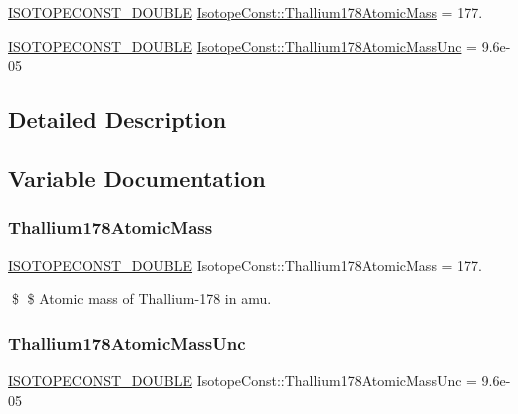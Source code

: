 \begin{DoxyCompactItemize}
\item 
\mbox{\hyperlink{group___isotope_const-_macros_ga8f45a7272ce02c0b4c65c44636ed719a}{I\+S\+O\+T\+O\+P\+E\+C\+O\+N\+S\+T\+\_\+\+D\+O\+U\+B\+LE}} \mbox{\hyperlink{group___isotope_const-_thallium-_tl178_ga391e9a295873758c7dcb5cfd9c725938}{Isotope\+Const\+::\+Thallium178\+Atomic\+Mass}} = 177.
\item 
\mbox{\hyperlink{group___isotope_const-_macros_ga8f45a7272ce02c0b4c65c44636ed719a}{I\+S\+O\+T\+O\+P\+E\+C\+O\+N\+S\+T\+\_\+\+D\+O\+U\+B\+LE}} \mbox{\hyperlink{group___isotope_const-_thallium-_tl178_gad038f4a74674a461293bec9de8602305}{Isotope\+Const\+::\+Thallium178\+Atomic\+Mass\+Unc}} = 9.\+6e-\/05
\end{DoxyCompactItemize}


\subsection{Detailed Description}


\subsection{Variable Documentation}
\mbox{\label{group___isotope_const-_thallium-_tl178_ga391e9a295873758c7dcb5cfd9c725938}} 
\subsubsection{\texorpdfstring{Thallium178\+Atomic\+Mass}{Thallium178AtomicMass}}
{\footnotesize\ttfamily \mbox{\hyperlink{group___isotope_const-_macros_ga8f45a7272ce02c0b4c65c44636ed719a}{I\+S\+O\+T\+O\+P\+E\+C\+O\+N\+S\+T\+\_\+\+D\+O\+U\+B\+LE}} Isotope\+Const\+::\+Thallium178\+Atomic\+Mass = 177.}

\$ \$ Atomic mass of Thallium-\/178 in amu. \mbox{\label{group___isotope_const-_thallium-_tl178_gad038f4a74674a461293bec9de8602305}} 
\subsubsection{\texorpdfstring{Thallium178\+Atomic\+Mass\+Unc}{Thallium178AtomicMassUnc}}
{\footnotesize\ttfamily \mbox{\hyperlink{group___isotope_const-_macros_ga8f45a7272ce02c0b4c65c44636ed719a}{I\+S\+O\+T\+O\+P\+E\+C\+O\+N\+S\+T\+\_\+\+D\+O\+U\+B\+LE}} Isotope\+Const\+::\+Thallium178\+Atomic\+Mass\+Unc = 9.\+6e-\/05}

